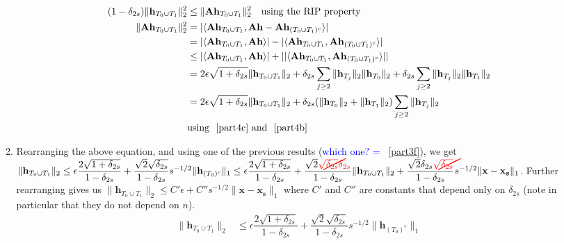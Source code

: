 \documentclass[11pt]{article}
\begin{document}
\begin{enumerate}
\begin{enumerate}
\begin{equation}\label{part4d}
\begin{aligned}
(1-\delta_{2s})\|\mathbf{h}_{T_0 \cup T_1}\|^2_2 
 & \leq  \|\mathbf{Ah}_{T_0 \cup T_1}\|^2_2  \quad \text{using the RIP property}\\
\|\mathbf{Ah}_{T_0 \cup T_1}\|^2_2 &= |\langle \mathbf{Ah}_{T_0 \cup T_1} , \mathbf{Ah} - \mathbf{Ah}_{(T_{0} \cup T_{1})^c} \rangle|\\ &=  |\langle \mathbf{Ah}_{T_0 \cup T_1} , \mathbf{Ah}\rangle| - |\langle \mathbf{Ah}_{T_0 \cup T_1} , \mathbf{Ah}_{(T_{0} \cup T_{1})^c} \rangle|\\
&\leq |\langle \mathbf{Ah}_{T_0 \cup T_1} , \mathbf{Ah}\rangle| + | |\langle \mathbf{Ah}_{T_0 \cup T_1} , \mathbf{Ah}_{(T_{0} \cup T_{1})^c} \rangle| |\\ &= 2 \epsilon \sqrt{1+\delta_{2s}}\|\mathbf{h}_{T_0 \cup T_1}\|_2  + \delta_{2s} \sum\limits_{j\geq 2} \|\mathbf{h}_{T_j}\|_2 \|\mathbf{h}_{T_0}\|_2 + \delta_{2s} \sum\limits_{j\geq 2} \|\mathbf{h}_{T_j}\|_2 \|\mathbf{h}_{T_1}\|_2\\
&= 2 \epsilon \sqrt{1+\delta_{2s}}\|\mathbf{h}_{T_0 \cup T_1}\|_2 + \delta_{2s}(\|\mathbf{h}_{T_0}\|_2 + \|\mathbf{h}_{T_1}\|_2) \sum_{j \geq 2} \|\mathbf{h}_{T_j}\|_2\\
& \text{using ~\ref{part4c} and ~\ref{part4b}}
\end{aligned}
\end{equation}
\item Rearranging the above equation, and using one of the previous results (\textcolor{blue}{which one? = ~\ref{part3f}}), 
we get $\|\mathbf{h}_{T_0 \cup T_1}\|_2 \leq \epsilon \dfrac{2\sqrt{1+\delta_{2s}}}{1-\delta_{2s}} + \dfrac{\sqrt{2}\sqrt{\delta_{2s}}}{1-\delta_{2s}} s^{-1/2} \|\mathbf{h}_{(T_0)^c}\|_1 
\\ \leq \epsilon \dfrac{2\sqrt{1+\delta_{2s}}}{1-\delta_{2s}} + \dfrac{\sqrt{2}\textcolor{red}{\cancel{\sqrt{\delta_{2s}}}} \textcolor{red}{\delta_{2s}}}{1-\delta_{2s}} \|\mathbf{h}_{T_0 \cup T_1}\|_2 + \dfrac{\sqrt{2}\delta_{2s}\textcolor{red}{\cancel{\sqrt{\delta_{2s}}}}}{1-\delta_{2s}} s^{-1/2} \|\mathbf{x}-\mathbf{x_s}\|_1$. Further rearranging gives us
$\|\mathbf{h}_{T_0 \cup T_1}\|_2  \leq C' \epsilon + C'' s^{-1/2} \|\mathbf{x}-\mathbf{x_s}\|_1$ where $C'$ and $C''$ are constants that depend only on $\delta_{2s}$ (note in particular that they do not depend on $n$).
\begin{equation}\label{part4e}
\begin{aligned}
\|\mathbf{h}_{T_0 \cup T_1}\|_2 & \leq \epsilon \dfrac{2\sqrt{1+\delta_{2s}}}{1-\delta_{2s}} + \dfrac{\sqrt{2}\sqrt{\delta_{2s}}}{1-\delta_{2s}} s^{-1/2} \|\mathbf{h}_{(T_0)^c}\|_1 

\end{aligned}
\end{equation}
\end{enumerate}
\end{enumerate}
\end{document}
